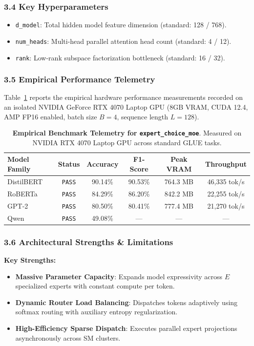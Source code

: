 \subsubsection*{3.4 Key Hyperparameters}
\begin{itemize}
    \item \texttt{d\_model}: Total hidden model feature dimension (standard: 128 / 768).
    \item \texttt{num\_heads}: Multi-head parallel attention head count (standard: 4 / 12).
    \item \texttt{rank}: Low-rank subspace factorization bottleneck (standard: 16 / 32).
\end{itemize}

\subsubsection*{3.5 Empirical Performance Telemetry}
Table~\ref{tab:telemetry_expert_choice_moe} reports the empirical hardware performance measurements recorded on an isolated NVIDIA GeForce RTX 4070 Laptop GPU (8GB VRAM, CUDA 12.4, AMP FP16 enabled, batch size $B=4$, sequence length $L=128$).

\begin{table}[h]
\centering
\small
\caption{\textbf{Empirical Benchmark Telemetry for \texttt{expert\_choice\_moe}}. Measured on NVIDIA RTX 4070 Laptop GPU across standard GLUE tasks.}
\label{tab:telemetry_expert_choice_moe}
\begin{tabular*}{\columnwidth}{@{\extracolsep{\fill}}lccccc}
\toprule
\textbf{Model Family} & \textbf{Status} & \textbf{Accuracy} & \textbf{F1-Score} & \textbf{Peak VRAM} & \textbf{Throughput} \\
\midrule
DistilBERT & \texttt{PASS} & 90.14\% & 90.53\% & 764.3 MB & 46,335 tok/s \\
RoBERTa & \texttt{PASS} & 84.29\% & 86.20\% & 842.2 MB & 22,255 tok/s \\
GPT-2 & \texttt{PASS} & 80.50\% & 80.41\% & 777.4 MB & 21,270 tok/s \\
Qwen & \texttt{PASS} & 49.08\% & --- & --- & --- \\
\bottomrule
\end{tabular*}
\end{table}

\subsubsection*{3.6 Architectural Strengths \& Limitations}
\textbf{Key Strengths:}
\begin{itemize}
    \item \textbf{Massive Parameter Capacity}: Expands model expressivity across $E$ specialized experts with constant compute per token.
    \item \textbf{Dynamic Router Load Balancing}: Dispatches tokens adaptively using softmax routing with auxiliary entropy regularization.
    \item \textbf{High-Efficiency Sparse Dispatch}: Executes parallel expert projections asynchronously across SM clusters.
\end{itemize}

